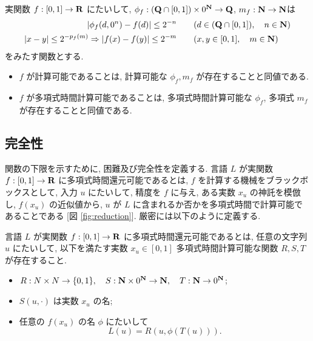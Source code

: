  \begin{lemma}
  実関数 $f:[0,1] \to \mathbf R$ にたいして,
  $\phi_f: (\mathbf Q \cap [0, 1]) \times 0^\mathbf N \to \mathbf Q$, $m_f: \mathbf N \to \mathbf N$は
  \begin{align}
   |\phi_f(d, 0^n) - f(d)| \le 2^{-n} 
   &\qquad (d \in (\mathbf Q \cap [0,1]), \quad n \in \mathbf N)\\
   |x-y| \le 2^{-p_f(m)} \Rightarrow |f(x) - f(y)| \le 2^{-m}
   &\qquad (x, y \in [0, 1], \quad m \in \mathbf N)
  \end{align}
 をみたす関数とする.
  \begin{itemize}
   \item $f$ が計算可能であることは, 計算可能な $\phi_f, m_f$ が存在することと同値である. 
   \item $f$ が多項式時間計算可能であることは, 多項式時間計算可能な 
  $\phi_f$, 多項式 $m_f$ が存在することと同値である.
  \end{itemize}
\end{lemma}

\subsection{完全性}

 関数の下限を示すために, 困難及び完全性を定義する.
 言語 $L$ が実関数 $f:[0,1] \to \mathbf R$ に多項式時間還元可能であるとは,
 $f$ を計算する機械をブラックボックスとして, 入力 $u$ にたいして,
 精度を $f$ に与え, ある実数 $x_u$ の神託を模倣し, $f(x_u)$ の近似値から,
 $u$ が $L$ に含まれるか否かを多項式時間で計算可能であることである
 [図 \ref{fig:reduction}].
 厳密には以下のように定義する.

 \begin{definition}[多項式時間還元可能]
  言語 $L$ が実関数 $f:[0,1] \to \mathbf R$ に多項式時間還元可能であるとは, 
  任意の文字列 $u$ にたいして, 以下を満たす実数 $x_u \in [0,1]$
  多項式時間計算可能な関数 $R,S,T$ が存在すること.
  \begin{itemize}
   \item $R:N \times N \to \{0,1\}, \quad S:\mathbf N\times 0^\mathbf N \to \mathbf N, \quad
  T:\mathbf N \to 0^\mathbf N$;
   \item $S(u, \cdot)$ は実数 $x_u$ の名;
   \item 任意の $f(x_u)$ の名 $\phi$ にたいして
	 \[
	  L(u) = R(u, \phi(T(u))).
	 \]
  \end{itemize}
 \end{definition}

